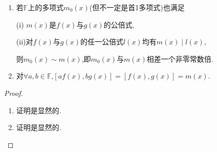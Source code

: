 \documentclass[../../main.tex]{subfiles}
\begin{document}
\begin{proposition}\label{proposition:最小公倍式的小结论}
\begin{enumerate}[(1)]
\item 若$\mathbb{F}$上的多项式$m_0(x)$(但不一定是首1多项式)也满足

(i)\(\,\,m(x)\)是\(f(x)\)与\(g(x)\)的公倍式,

(ii)对\(f(x)\)与\(g(x)\)的任一公倍式\(l(x)\)均有\(m(x)\mid l(x)\),

则$m_0(x)\sim m(x)$,即$m_0(x)$与$m(x)$相差一个非零常数倍.

\item 对$\forall a,b\in\mathbb{F}$,$[af(x),bg(x)]=[f(x),g(x)]=m(x)$.
\end{enumerate}
\end{proposition}
\begin{proof}
\begin{enumerate}[(1)]
\item 证明是显然的.

\item 证明是显然的.
\end{enumerate}
\end{proof}
\end{document}
